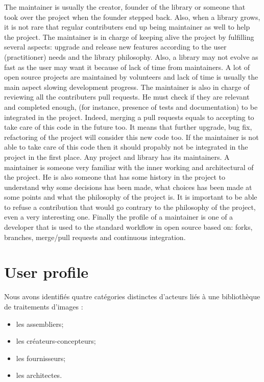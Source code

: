 The maintainer is usually the creator, founder of the library or someone that took over the project when the founder
stepped back. Also, when a library grows, it is not rare that regular contributers end up being maintainer as well to
help the project. The maintainer is in charge of keeping alive the project by fulfilling several aspects: upgrade and
release new features according to the user (practitioner) needs and the library philosophy. Also, a library may not
evolve as fast as the user may want it because of lack of time from maintainers. A lot of open source projects are
maintained by volunteers and lack of time is usually the main aspect slowing development progress. The maintainer is
also in charge of reviewing all the contributers pull requests. He must check if they are relevant and completed enough,
(for instance, presence of tests and documentation) to be integrated in the project. Indeed, merging a pull requests
equals to accepting to take care of this code in the future too. It means that further upgrade, bug fix, refactoring of
the project will consider this new code too. If the maintainer is not able to take care of this code then it should
propably not be integrated in the project in the first place. Any project and library has its maintainers. A maintainer
is someone very familiar with the inner working and architectural of the project. He is also someone that has some
history in the project to understand why some decisions has been made, what choices has been made at some points and
what the philosophy of the project is. It is important to be able to refuse a contribution that would go contrary to the
philosophy of the project, even a very interesting one. Finally the profile of a maintainer is one of a developer that
is used to the standard workflow in open source based on: forks, branches, merge/pull requests and continuous
integration.



\chapter{User profile}

Nous avons identifiés quatre catégories distinctes d'acteurs liés à une bibliothèque de traitements
d'images :
\begin{itemize}
  \item les assembliers;
  \item les créateurs-concepteurs;
  \item les fournisseurs;
  \item les architectes.
\end{itemize}
